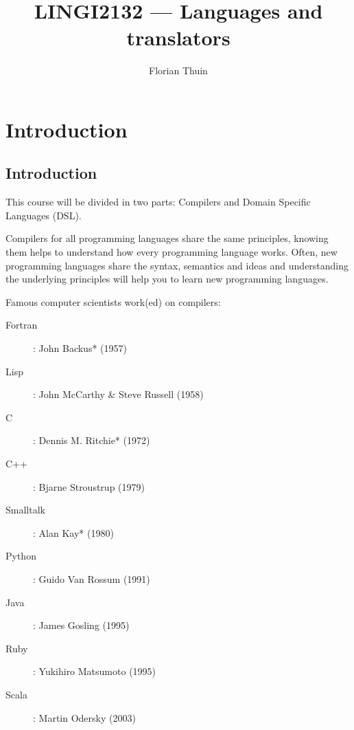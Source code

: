 \documentclass[12pt, a4paper]{article}
\author{Florian Thuin}
\title{LINGI2132 --- Languages and translators}
\begin{document}
    \maketitle
  \section{Introduction}
  \subsection{Introduction}

  This course will be divided in two parts: Compilers and Domain Specific
  Languages (DSL). \newline

  Compilers for all programming languages share the same principles, knowing
  them helps to understand how every programming language works. Often, new
  programming languages share the syntax, semantics and ideas and understanding
  the underlying principles will help you to learn new programming languages.
  \newline

  Famous computer scientists work(ed) on compilers:

  \begin{description}
    \item[Fortran]: John Backus* (1957)
    \item[Lisp]: John McCarthy \& Steve Russell (1958)
    \item[C]: Dennis M. Ritchie* (1972)
    \item[C++]: Bjarne Stroustrup (1979)
    \item[Smalltalk]: Alan Kay* (1980)
    \item[Python]: Guido Van Rossum (1991)
    \item[Java]: James Gosling (1995)
    \item[Ruby]: Yukihiro Matsumoto (1995)
    \item[Scala]: Martin Odersky (2003)
  \end{description}
\end{document}
